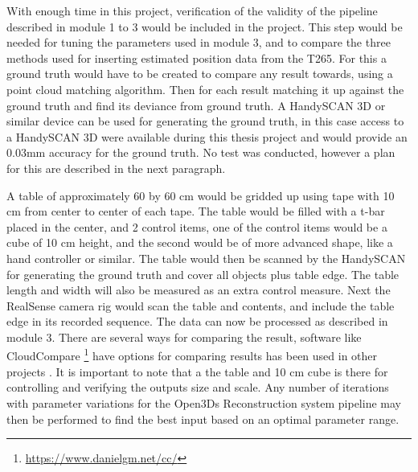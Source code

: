 With enough time in this project, verification of the validity of the pipeline described in module 1 to 3 would be included in the project. This step would be needed for tuning the parameters used in module 3, and to compare the three methods used for inserting estimated position data from the T265. For this a ground truth would have to be created to compare any result towards, using a point cloud matching algorithm. Then for each result matching it up against the ground truth and find its deviance from ground truth. A HandySCAN 3D or similar device can be used for generating the ground truth, in this case access to a HandySCAN 3D were available during this thesis project and would provide an 0.03mm accuracy for the ground truth. No test was conducted, however a plan for this are described in the next paragraph. 

A table of approximately 60 by 60 cm would be gridded up using tape with 10 cm from center to center of each tape. The table would be filled with a t-bar placed in the center, and 2 control items, one of the control items would be a cube of 10 cm height, and the second would be of more advanced shape, like a hand controller or similar. The table would then be scanned by the HandySCAN for generating the ground truth and cover all objects plus table edge. The table length and width will also be measured as an extra control measure. Next the RealSense camera rig would scan the table and contents, and include the table edge in its recorded sequence. The data can now be processed as described in module 3. There are several ways for comparing the result, software like CloudCompare \footnote{\url{https://www.danielgm.net/cc/}} have options for comparing results has been used in other projects \cite{Handa2014}. It is important to note that a the table and 10 cm cube is there for controlling and verifying the outputs size and scale. Any number of iterations with parameter variations for the Open3Ds Reconstruction system pipeline may then be performed to find the best input based on an optimal parameter range. 

